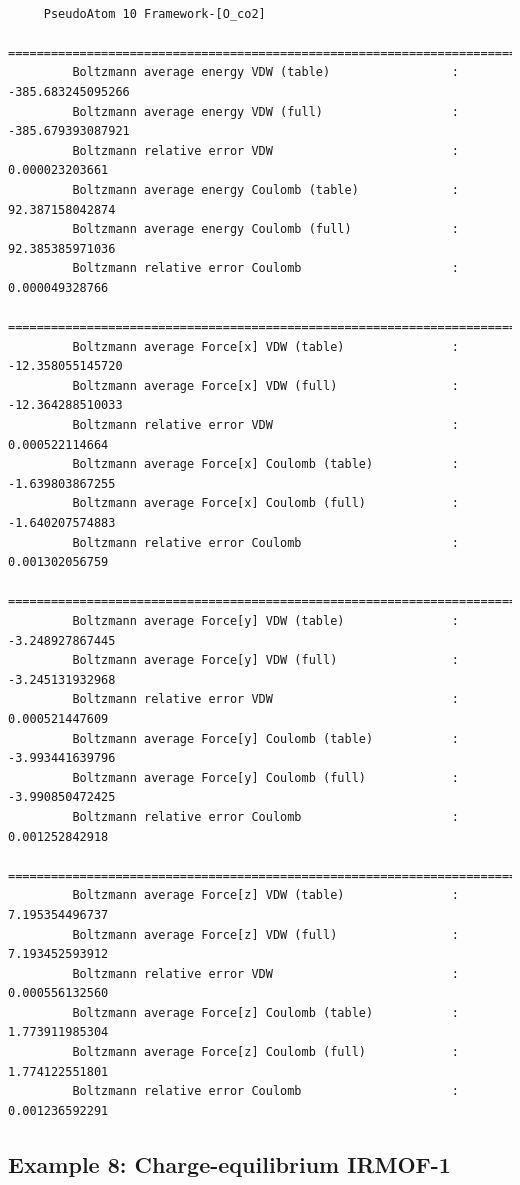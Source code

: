 \begin{tiny}
\begin{verbatim}
     
     PseudoAtom 10 Framework-[O_co2]
     =========================================================================================
         Boltzmann average energy VDW (table)                 :  -385.683245095266
         Boltzmann average energy VDW (full)                  :  -385.679393087921
         Boltzmann relative error VDW                         :     0.000023203661
         Boltzmann average energy Coulomb (table)             :    92.387158042874
         Boltzmann average energy Coulomb (full)              :    92.385385971036
         Boltzmann relative error Coulomb                     :     0.000049328766
     =========================================================================================
         Boltzmann average Force[x] VDW (table)               :   -12.358055145720
         Boltzmann average Force[x] VDW (full)                :   -12.364288510033
         Boltzmann relative error VDW                         :     0.000522114664
         Boltzmann average Force[x] Coulomb (table)           :    -1.639803867255
         Boltzmann average Force[x] Coulomb (full)            :    -1.640207574883
         Boltzmann relative error Coulomb                     :     0.001302056759
     =========================================================================================
         Boltzmann average Force[y] VDW (table)               :    -3.248927867445
         Boltzmann average Force[y] VDW (full)                :    -3.245131932968
         Boltzmann relative error VDW                         :     0.000521447609
         Boltzmann average Force[y] Coulomb (table)           :    -3.993441639796
         Boltzmann average Force[y] Coulomb (full)            :    -3.990850472425
         Boltzmann relative error Coulomb                     :     0.001252842918
     =========================================================================================
         Boltzmann average Force[z] VDW (table)               :     7.195354496737
         Boltzmann average Force[z] VDW (full)                :     7.193452593912
         Boltzmann relative error VDW                         :     0.000556132560
         Boltzmann average Force[z] Coulomb (table)           :     1.773911985304
         Boltzmann average Force[z] Coulomb (full)            :     1.774122551801
         Boltzmann relative error Coulomb                     :     0.001236592291
\end{verbatim}
\end{tiny}

\subsection*{Example 8: Charge-equilibrium IRMOF-1}

